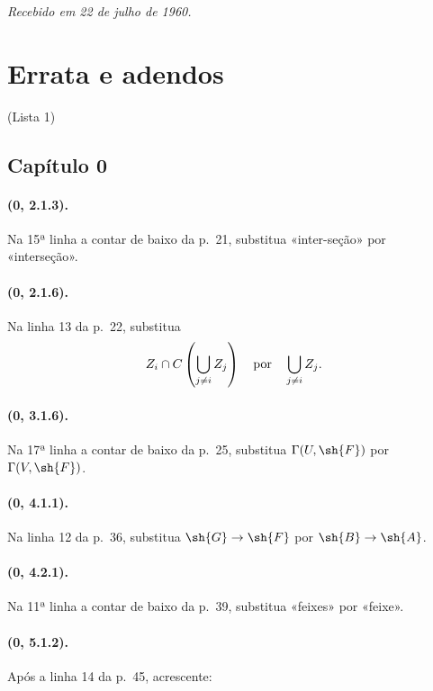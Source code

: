 \documentclass[oneside,10pt]{amsart}
\makeatletter
\newcommand{\ega@arrow}[2]{\mathchoice{#1}{#2}{#2}{#2}}
\renewcommand{\to}{\ega@arrow{\longrightarrow}{\rightarrow}}
\newcommand{\oldpage}[2][]{\marginnote{\normalfont\footnotesize\textbf{#1}~|~#2}\ignorespaces}
\makeatother
\begin{document}
\begin{flushright}
\emph{Recebido em 22 de julho de 1960.}
\end{flushright}
\endgroup
\oldpage[II]{216}
\oldpage[II]{217}
{}
\section*{Errata e adendos}
\begin{center}
\large (Lista 1)
\end{center}

\subsection*{Capítulo 0}

\paragraph{(0, 2.1.3).}
Na 15ª linha a contar de baixo da p.~21, substitua «inter-seção» por
«interseção».

\paragraph{(0, 2.1.6).}
Na linha 13 da p.~22, substitua
\[
  Z_i\cap C\left(\bigcup_{j\ne i}Z_j\right)
  \quad\hbox{por}\quad
  \bigcup_{j\ne i}Z_j.
\]

\paragraph{(0, 3.1.6).}
Na 17ª linha a contar de baixo da p.~25, substitua
$\Gamma(U,\sh{F})$ por $\Gamma(V,\sh{F})$.

\paragraph{(0, 4.1.1).}
Na linha 12 da p.~36, substitua $\sh{G}\to\sh{F}$ por
$\sh{B}\to\sh{A}$.

\paragraph{(0, 4.2.1).}
Na 11ª linha a contar de baixo da p.~39, substitua «feixes» por
«feixe».

\paragraph{(0, 5.1.2).}
Após a linha 14 da p.~45, acrescente:
\end{document}
